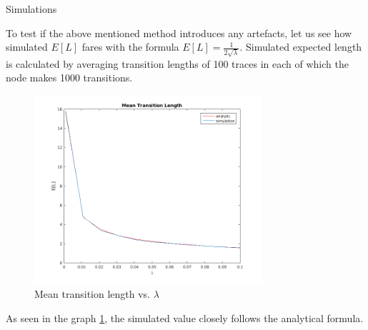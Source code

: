 \documentclass{beamer}
\begin{document}
\begin{frame}{Simulations} {}

To test if the above mentioned method introduces any artefacts, let us see how simulated $E[L]$ fares with the formula $E[L] = \frac{1}{2\sqrt{\lambda}}$. Simulated expected length is calculated by averaging transition lengths of 100 traces in each of which the node makes 1000 transitions. 
\begin{figure}[h]
	\centering \vspace{-0.1in}
	\includegraphics[width=0.75\textwidth]{images/rwpStat.png}
	\vspace{-20pt} \caption[Mean transition length vs. $\lambda$]{Mean transition length vs. $\lambda$}
	\label{fig:rwpEL}
\end{figure}
As seen in the graph \ref{fig:rwpEL}, the simulated value closely follows the analytical formula.

\end{frame}
\end{document}
